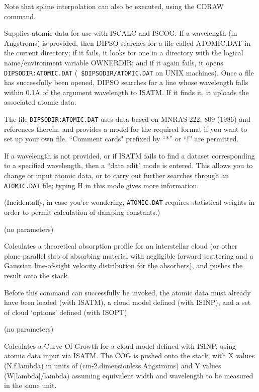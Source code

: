 \begin {description}
Note that spline interpolation can also be executed, using the CDRAW
command.

\item [ISATM] [wavelength]

Supplies atomic data for use with ISCALC and ISCOG. If a wavelength
(in Angstroms) is provided, then DIPSO searches for a file called
ATOMIC.DAT in the current directory; if it fails, it looks for one in
a directory with the logical name/environment variable  OWNERDIR;  and
if it again fails, it opens {\tt DIPSODIR:\-ATOMIC.DAT} ({\tt
\$DIPSO\-DIR/ATOMIC.\-DAT} on UNIX machines). Once a file has
successfully been opened, DIPSO searches for a line whose wavelength
falls within 0.1A of the argument wavelength to ISATM. If it finds it,
it uploads the associated atomic data.

The file {\tt DIPSODIR:ATOMIC.DAT} uses data based on MNRAS 222, 809 (1986)
and references therein, and provides a model for the required format
if you want to set up your own file.
``Comment cards" prefixed by ``*'' or ``!'' are permitted.

If a wavelength is not provided, or if ISATM fails to find a dataset
corresponding to a specified wavelength, then a ``data edit" mode is
entered. This allows you to change or input atomic data, or to carry
out further searches through an {\tt ATOMIC.DAT} file;  typing H in
this mode gives more information.

(Incidentally, in case you're wondering, {\tt ATOMIC.DAT} requires
statistical weights in order to permit calculation of damping
constants.)

\item [ISCALC] (no parameters)

Calculates a theoretical absorption profile for an interstellar cloud
(or other plane-parallel slab of absorbing material with negligible
forward scattering and a Gaussian line-of-sight velocity distribution
for the absorbers), and pushes the result onto the stack.

Before this command can successfully be invoked, the atomic data must
already have been loaded (with ISATM), a cloud model defined (with
ISINP), and a set of cloud `options' defined (with ISOPT).

\item [ISCOG] (no parameters)

Calculates a Curve-Of-Growth for a cloud model defined with ISINP,
using atomic data input via ISATM. The COG is pushed onto the stack,
with X values (N.f.lambda) in units of (cm-2.dimensionless.Angstroms)
and Y values (W[lambda]/lambda) assuming equivalent width and
wavelength to be measured in the same unit.


\end{description}
